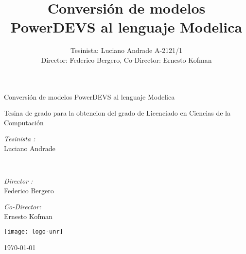 \documentclass[a4paper,	11pt]{report}
\begin{document}
\renewcommand\floatpagefraction{.9}
\renewcommand\topfraction{.9}
\renewcommand\bottomfraction{.9}
\renewcommand\textfraction{.1}
\setcounter{totalnumber}{50}
\setcounter{topnumber}{50}
\setcounter{bottomnumber}{50}
\newcommand{\quotes}[1]{``#1''}

\title{Conversión de modelos PowerDEVS al lenguaje Modelica}
\author{Tesinista: Luciano Andrade A-2121/1\\ Director: Federico Bergero, Co-Director: Ernesto Kofman} 


\begin{titlepage}
\begin{center}

\huge Conversión de modelos PowerDEVS al lenguaje Modelica

\vfill

Tesina de grado para la obtencion del grado de Licenciado en Ciencias de la Computación

\begin{minipage}[t]{0.4\textwidth}
\begin{flushleft} \large
\emph{Tesinista :}\\
Luciano Andrade
\end{flushleft}
\end{minipage}\\ 
\vfill
\begin{minipage}[t]{0.4\textwidth}
\begin{flushleft} \large
\emph{Director :}\\
Federico Bergero
\end{flushleft}
\end{minipage}%
\begin{minipage}[t]{0.4\textwidth}
\begin{flushright} \large
\emph{Co-Director:} \\
Ernesto Kofman 
\end{flushright}
\end{minipage}

\vfill

\texttt{[image: logo-unr]}

\vfill

{\large \today}
\end{center}
\end{titlepage}


\tableofcontents
\end{document}
